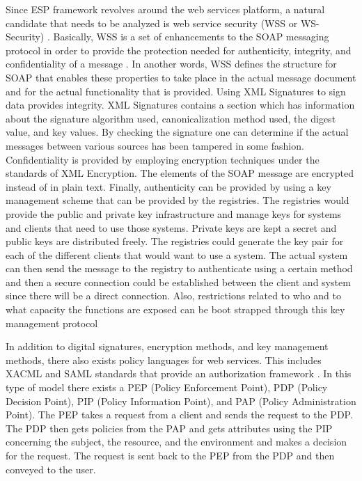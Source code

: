 Since ESP framework revolves around the web services platform, a
natural candidate that needs to be analyzed is web service security (WSS
or WS-Security) \cite{securews}.  Basically, WSS is a set of
enhancements to the SOAP messaging protocol in order to provide the
protection needed for authenticity, integrity, and confidentiality of
a message \cite{wss}.  In another words, WSS defines the structure for
SOAP that enables these properties to take place in the actual message
document and for the actual functionality that is provided.  Using XML
Signatures to sign data provides integrity.  XML Signatures contains a
section which has information about the signature algorithm used,
canonicalization method used, the digest value, and key values.  By
checking the signature one can determine if the actual messages
between various sources has been tampered in some fashion.  Confidentiality
is provided by employing encryption techniques under the standards of
XML Encryption. The elements of the SOAP message are
encrypted instead of in plain text.  Finally, authenticity can be
provided by using a key management scheme that can be provided by the
registries.  The registries would provide the public and
private key infrastructure and manage keys for systems and clients
that need to use those systems.  Private keys are kept a secret and
public keys are distributed freely.  The registries could generate the
key pair for each of the different clients that would want to use a
system.  The actual system can then send the message to the registry
to authenticate using a certain method and then a secure connection could
be established between the client and system since there will be a
direct connection.  Also, restrictions related to who and to what capacity
the functions are exposed can be boot strapped through this key management
protocol

In addition to digital signatures, encryption methods, and key management
methods, there also exists policy languages for web services.  This includes
XACML and SAML standards that provide an authorization framework \cite{godik:oea}.  In this
type of model there exists a PEP (Policy Enforcement Point), PDP (Policy
Decision Point), PIP (Policy Information Point), and PAP (Policy Administration
Point).  The PEP takes a request from a client and sends the request to the PDP.
The PDP then gets policies from the PAP and gets attributes using the PIP concerning
the subject, the resource, and the environment and makes a decision for the request.
The request is sent back to the PEP from the PDP and then conveyed to the user.

